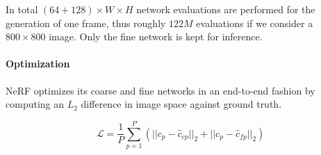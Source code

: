 In total $(64 + 128) \times W \times H$ network evaluations are performed for the generation of one frame, thus roughly $122M$ evaluations if we consider a $800 \times 800$ image. Only the fine network is kept for inference.

\paragraph{Optimization}

\gls{NeRF} optimizes its coarse and fine networks in an end-to-end fashion by computing an $L_2$ difference in image space against ground truth.

\begin{equation}
    \mathcal{L} = \frac{1}{P} \sum_{p=1}^{P} (|| c_p - \hat{c}_{cp} ||_2 + || c_p - \hat{c}_{fp} ||_2 )
\end{equation}

